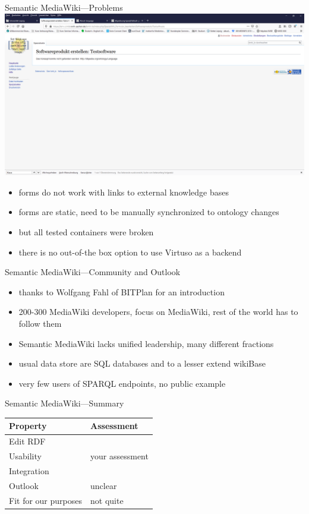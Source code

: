 \documentclass[aspectratio=1610]{beamer}
\newcommand{\cmark}{\ding{51}}%
\newcommand{\xmark}{\ding{55}}%
\begin{document}
\begin{frame}{Semantic MediaWiki---Problems}
\centering
\includegraphics[width=0.7\paperwidth]{img/smw-create-product-error.png}
\begin{itemize}
\item forms do not work with links to external knowledge bases
\item forms are static, need to be manually synchronized to  ontology changes
\item but all tested containers were broken
\item there is no out-of-the box option to use Virtuso as a backend
\end{itemize}
\end{frame}

\begin{frame}{Semantic MediaWiki---Community and Outlook}
\begin{itemize}
\item thanks to Wolfgang Fahl of BITPlan for an introduction
\item 200-300 MediaWiki developers, focus on MediaWiki, rest of the world has to follow them
\item Semantic MediaWiki lacks unified leadership, many different fractions
\item usual data store are SQL databases and to a lesser extend wikiBase
\item very few users of SPARQL endpoints, no public example 
\end{itemize}
\end{frame}

\begin{frame}{Semantic MediaWiki---Summary}
\centering
\begin{tabulary}{\textwidth}{lL}
\toprule
Property		&Assessment\\
\midrule
Edit RDF		&\cmark\\
Usability		&your assessment\\
Integration		&\xmark\\
Outlook			&unclear\\
\midrule
Fit for our purposes	&not quite\\
\bottomrule
\end{tabulary}
\end{frame}
\end{document}

